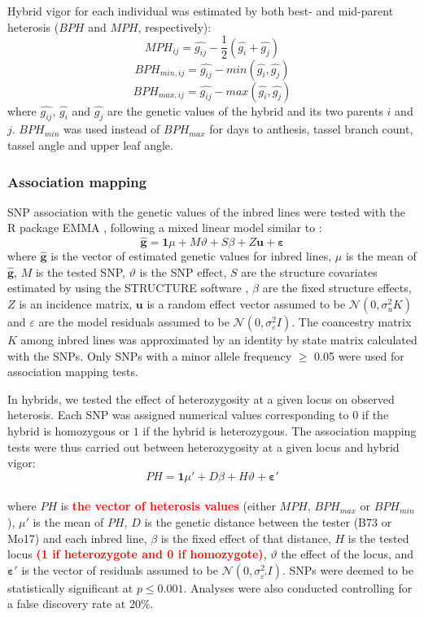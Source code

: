 \documentclass[12pt]{article}
\newcommand{\sme}[1]{\textcolor{red}{\bf #1}}
\begin{document}
Hybrid vigor for each individual was estimated by both best- and mid-parent heterosis ($BPH$ and $MPH$, respectively):
%
\[ MPH_{ij}=\hat{g_{ij}}-\frac{1}{2}(\hat{g_{i}}+\hat{g_{j}}) \]
\[ BPH_{min,ij}=\hat{g_{ij}}-min(\hat{g_{i}} ,\hat{g_{j}}) \] 
\[ BPH_{max,ij}=\hat{g_{ij}}-max(\hat{g_{i}} ,\hat{g_{j}}) \]
%
where $\hat{g_{ij}}$, $\hat{g_{i}}$ and $\hat{g_{j}}$ are the genetic values of the hybrid and its two parents $i$ and $j$. $BPH_{min}$ was used instead of $BPH_{max}$ for days to anthesis, tassel branch count, tassel angle and upper leaf angle.

\subsubsection*{Association mapping}

SNP association with the genetic values of the inbred lines were tested with the R package EMMA \citep{Kang2008}, following a mixed linear model similar to \citet{Yu2006}:
%
\[\mathbf{\hat{g}}=\mathbf{1}\mu + M\vartheta +S\beta +Z\mathbf{u}+\mathbf{\varepsilon}\]
%
where $\mathbf{\hat{g}}$ is the vector of estimated genetic values for inbred lines, $\mu$ is the mean of $\mathbf{\hat{g}}$, $M$ is the tested SNP, $\vartheta$ is the SNP effect, $S$ are the structure covariates estimated  by \citet{Flint-Garcia2005} using the STRUCTURE software \citep{Pritchard2000}, $\beta$ are the fixed structure effects, $Z$ is an incidence matrix, $\mathbf{u}$ is a random effect vector assumed to be $\mathcal{N}(0,\sigma_{u}^{2} K)$ and $\varepsilon$ are the model residuals assumed to be $\mathcal{N}(0,\sigma_{\varepsilon}^{2}I)$. 
The coancestry matrix $K$ among inbred lines was approximated by an identity by state matrix calculated with the SNPs. Only SNPs with a minor allele frequency $\ge$ 0.05 were used for association mapping tests.

In hybrids, we tested the effect of heterozygosity at a given locus on observed heterosis. 
Each SNP was assigned numerical values corresponding to $0$ if the hybrid is homozygous or $1$ if the hybrid is heterozygous. 
The association mapping tests were thus carried out between heterozygosity at a given locus and hybrid vigor:
%
\[PH=\mathbf{1}{\mu}'+D\beta +H\vartheta +\mathbf{{\varepsilon }'}\]  \\
%
where $PH$ is \sme{the vector of heterosis values }(either $MPH$, $BPH_{max}$ or $BPH_{min}$), ${\mu}'$ is the mean of $PH$, $D$ is the genetic distance between the tester (B73 or Mo17) and each inbred line, $\beta$ is the fixed effect of that distance, $H$ is the tested locus \sme{(1 if heterozygote and 0 if homozygote)}, $\vartheta$ the effect of the locus, and $\mathbf{{\varepsilon}'}$ is the vector of residuals assumed to be $\mathcal{N}(0,\sigma_{ {\varepsilon}'}^{2}I)$.  
SNPs were deemed to be statistically significant at $p\leq 0.001$. Analyses were also conducted controlling for a false discovery rate \citep{Benjamini1995} at 20\%.
\end{document}
